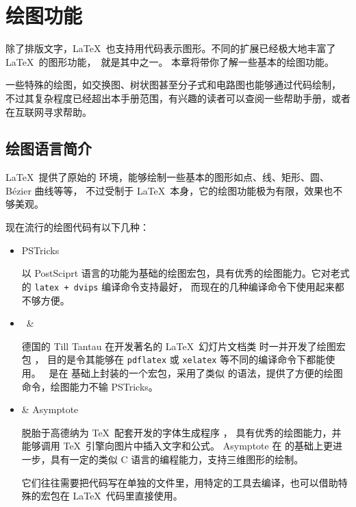 \chapter{绘图功能}\label{chap:graphics}

\begin{intro}
除了排版文字，\LaTeX\ 也支持用代码表示图形。不同的扩展已经极大地丰富了 \LaTeX\ 的图形功能，\TikZ\ 就是其中之一。
本章将带你了解一些基本的绘图功能。

一些特殊的绘图，如交换图、树状图甚至分子式和电路图也能够通过代码绘制，
不过其复杂程度已经超出本手册范围，有兴趣的读者可以查阅一些帮助手册，或者在互联网寻求帮助。
\end{intro}

\section{绘图语言简介}\label{sec:pict-lang}

\LaTeX\ 提供了原始的  环境，能够绘制一些基本的图形如点、线、矩形、圆、B\'ezier 曲线等等，
不过受制于 \LaTeX\ 本身，它的绘图功能极为有限，效果也不够美观。

现在流行的绘图代码有以下几种：
\begin{itemize}
  \item PSTricks \par
  以 PostSciprt 语言的功能为基础的绘图宏包，具有优秀的绘图能力。它对老式的 \texttt{latex + dvips} 编译命令支持最好，
  而现在的几种编译命令下使用起来都不够方便。

  \item \TikZ\ \&  \par
  德国的 Till Tantau 在开发著名的 \LaTeX\ 幻灯片文档类  时一并开发了绘图宏包 ，
  目的是令其能够在 \texttt{pdflatex} 或 \texttt{xelatex} 等不同的编译命令下都能使用。
  \TikZ\ 是在  基础上封装的一个宏包，采用了类似  的语法，提供了方便的绘图命令，绘图能力不输 PSTricks。

  \item {} \& Asymptote \par
   脱胎于高德纳为 \TeX\ 配套开发的字体生成程序 ，
  具有优秀的绘图能力，并能够调用 \TeX\ 引擎向图片中插入文字和公式。
  Asymptote 在  的基础上更进一步，具有一定的类似 C 语言的编程能力，支持三维图形的绘制。\par
  它们往往需要把代码写在单独的文件里，用特定的工具去编译，也可以借助特殊的宏包在 \LaTeX\ 代码里直接使用。
\end{itemize}

